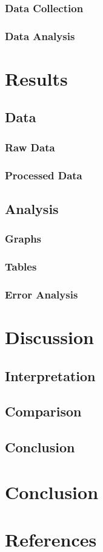 \documentclass[12pt]{article}
\begin{document}
                \subsubsection{Data Collection}
                \subsubsection{Data Analysis}
 
\section{Results}
        \subsection{Data}
                \subsubsection{Raw Data}
                \subsubsection{Processed Data}
        \subsection{Analysis}
                \subsubsection{Graphs}
                \subsubsection{Tables}
                \subsubsection{Error Analysis}
        \section{Discussion}
                \subsection{Interpretation}
                \subsection{Comparison}
                \subsection{Conclusion}


\section{Conclusion}


\section{References}
\end{document}
